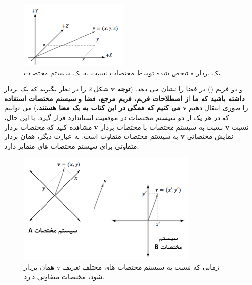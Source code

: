 {\begin{spacing}{1.5}
        \begin{figure}[H]
            \centering
            \setlength{\belowcaptionskip}{-10pt}
            \includegraphics[width=0.48\textwidth]{Images/4/1/4.Session.1.1.3}
            \caption{یک بردار مشخص شده توسط مختصات نسبت به یک سیستم مختصات.}
            \label{fig:4.Session.1.1.3}
        \end{figure}

        شکل \ref{fig:4.Session.1.1.4} را در نظر بگیرید که یک بردار \textbf{v} و دو فریم () در فضا را نشان می دهد. (\textbf{توجه داشته باشید که ما از اصطلاحات فریم، فریم مرجع، فضا و سیستم مختصات استفاده می کنیم که همگی در این کتاب به یک معنا هستند.})
        می توانیم \textbf{v} را طوری انتقال دهیم که در هر یک از دو سیستم مختصات در موقعیت استاندارد قرار گیرد. با این حال، مشاهده کنید که مختصات بردار \textbf{v} نسبت به سیستم مختصات  با مختصات بردار \textbf{v} نسبت به سیستم مختصات  متفاوت است.
        به عبارت دیگر، همان بردار \textbf{v} نمایش مختصاتی متفاوتی برای سیستم مختصات های متمایز دارد.

        \begin{figure}[H]
            \centering
            \setlength{\belowcaptionskip}{-10pt}
            \includegraphics[width=0.8\textwidth]{Images/4/1/4.Session.1.1.4}
            \caption{همان بردار v زمانی که نسبت به سیستم مختصات های مختلف تعریف شود، مختصات متفاوتی دارد.}
            \label{fig:4.Session.1.1.4}
        \end{figure}


\end{spacing}}
